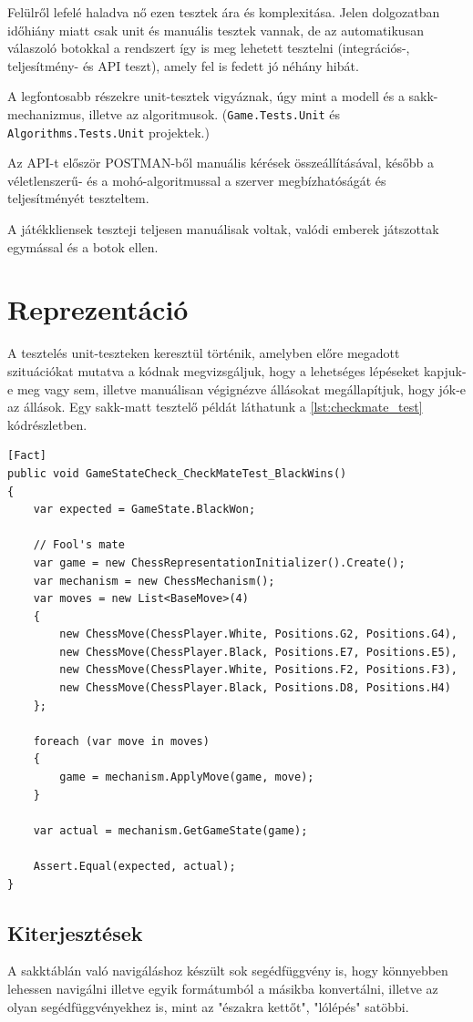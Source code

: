 \documentclass[twoside, a4paper, 12pt]{book}
\begin{document}
Felülről lefelé haladva nő ezen tesztek ára és komplexitása. Jelen dolgozatban időhiány miatt csak unit és manuális tesztek vannak, de az automatikusan válaszoló botokkal a rendszert így is meg lehetett tesztelni (integrációs-, teljesítmény- és API teszt), amely fel is fedett jó néhány hibát.

A legfontosabb részekre unit-tesztek vigyáznak, úgy mint a modell és a sakk-mechanizmus, illetve az algoritmusok. (\texttt{Game.Tests.Unit} és \texttt{Algorithms.Tests.Unit} projektek.)

Az API-t először POSTMAN-ből manuális kérések összeállításával, később a véletlenszerű- és a mohó-algoritmussal a szerver megbízhatóságát és teljesítményét teszteltem.

A játékkliensek teszteji teljesen manuálisak voltak, valódi emberek játszottak egymással és a botok ellen.

\section{Reprezentáció}
A tesztelés unit-teszteken keresztül történik, amelyben előre megadott szituációkat mutatva a kódnak megvizsgáljuk, hogy a lehetséges lépéseket kapjuk-e meg vagy sem, illetve manuálisan végignézve állásokat megállapítjuk, hogy jók-e az állások. Egy sakk-matt tesztelő példát láthatunk a \ref{lst:checkmate_test} kódrészletben.

\begin{lstlisting}[caption=Sakk-matt detektálás teszt, label=lst:checkmate_test, float]
[Fact]
public void GameStateCheck_CheckMateTest_BlackWins()
{
	var expected = GameState.BlackWon;
	
	// Fool's mate
	var game = new ChessRepresentationInitializer().Create();
	var mechanism = new ChessMechanism();
	var moves = new List<BaseMove>(4)
	{
		new ChessMove(ChessPlayer.White, Positions.G2, Positions.G4),
		new ChessMove(ChessPlayer.Black, Positions.E7, Positions.E5),
		new ChessMove(ChessPlayer.White, Positions.F2, Positions.F3),
		new ChessMove(ChessPlayer.Black, Positions.D8, Positions.H4)
	};
	
	foreach (var move in moves)
	{
		game = mechanism.ApplyMove(game, move);
	}
	
	var actual = mechanism.GetGameState(game);
	
	Assert.Equal(expected, actual);
}
\end{lstlisting}
\subsection{Kiterjesztések}
A sakktáblán való navigáláshoz készült sok segédfüggvény is, hogy könnyebben lehessen navigálni illetve egyik formátumból a másikba konvertálni, illetve az olyan segédfüggvényekhez is, mint az "északra kettőt", "lólépés" satöbbi.
\end{document}
